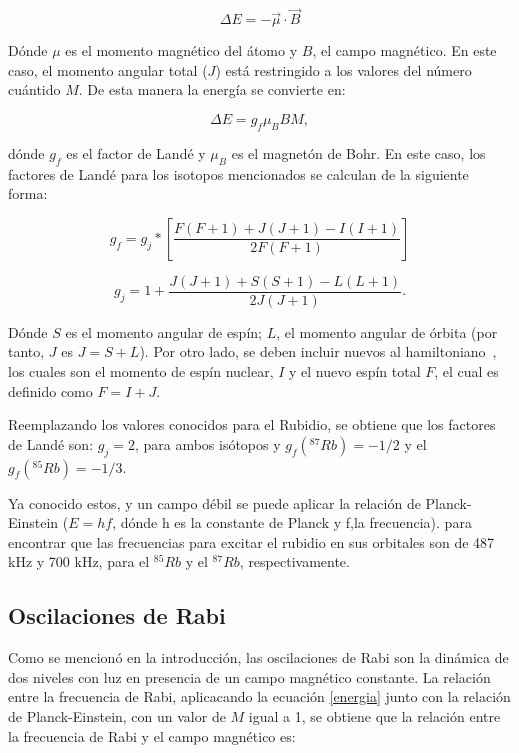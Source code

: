 \documentclass[%
 reprint,
 amsmath,amssymb,
 aps,
]{revtex4-1}
\begin{document}
\begin{equation}
    \Delta E=-\Vec{\mu} \cdot \Vec{B}
\end{equation}

Dónde $\mu$ es el momento magnético del átomo y $B$, el campo magnético. En este caso, el momento angular total ($J$) está restringido a los valores del número cuántido $M$. De esta manera la energía se convierte en:

\begin{equation}
    \Delta E=g_f\mu_B B M,
    \label{energia}
\end{equation}

dónde $g_f$ es el factor de Landé y $\mu_B$ es el magnetón de Bohr. En este caso, los factores de Landé para los isotopos mencionados se calculan de la siguiente forma:

\begin{equation}
    g_f=g_j*[\frac{F(F+1)+J(J+1)-I(I+1)}{2F(F+1)}]
\end{equation}

\begin{equation*}
      g_j=1+\frac{J(J+1)+S(S+1)-L(L+1)}{2J(J+1)}.
\end{equation*}

Dónde $S$ es el momento angular de espín; $L$, el momento angular de órbita (por tanto, $J$ es $J=S+L$). Por otro lado, se deben incluir nuevos al hamiltoniano~\cite{cohen}, los cuales son el momento de espín nuclear, $I$ y el nuevo espín total $F$, el cual es definido como $F=I+J$.

Reemplazando los valores conocidos para el Rubidio, se obtiene que los factores de Landé son: $g_j=2$, para ambos isótopos y $g_f(^{87}Rb)=-1/2$ y el $g_f(^{85}Rb)=-1/3$.

Ya conocido estos, y un campo débil se puede aplicar la relación de Planck-Einstein ($E=hf$, dónde h es la constante de Planck y f,la frecuencia). para encontrar que las frecuencias para excitar el rubidio en sus orbitales son de 487 kHz y 700 kHz, para el $^{85}Rb$ y el $^{87}Rb$, respectivamente.

\subsection{Oscilaciones de Rabi}

Como se mencionó en la introducción, las oscilaciones de Rabi son la dinámica de dos niveles con luz en presencia de un campo magnético constante. La relación entre la frecuencia de Rabi, aplicacando la ecuación \eqref{energia} junto con la relación de Planck-Einstein, con un valor de $M$ igual a 1, se obtiene que la relación entre la frecuencia de Rabi y el campo magnético es:
\end{document}
